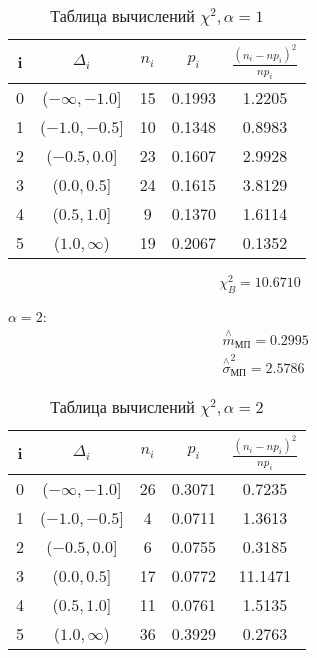 \documentclass[a4]{article}
\begin{document}
\begin{table}[H]
	\caption{Таблица вычислений $\chi^2, \alpha= 1$}
	\label{tab:my_label1}
	\begin{center}
		\vspace{5mm}
		\begin{tabular}{|c|c|c|c|c|}
			\hline
			i & $\Delta_i$ & $n_i$ & $p_i$ & $\frac{(n_i-np_i)^2}{np_i}$\\ \hline
0&  ($-\infty ,-1.0$]&  15&  0.1993&  1.2205\\ \hline
1&  ($-1.0,-0.5$]&  10&  0.1348&  0.8983\\ \hline
2&  ($-0.5,0.0$]&  23&  0.1607&  2.9928\\ \hline
3&  ($0.0,0.5$]&  24&  0.1615&  3.8129\\ \hline
4&  ($0.5,1.0$]&  9&  0.1370&  1.6114\\ \hline
5&  ($ 1.0,\infty$)&  19&  0.2067&  0.1352\\ \hline
		\end{tabular}
	\end{center}
\end{table}

$$\chi_B^2 =10.6710$$ 

$\alpha= 2$:
  \begin{equation}
  \begin{split}
  &\overset{\wedge}{m}_{\text{МП}} = 0.2995\\
  &  \overset{\wedge}{\sigma}^2_{\text{МП}} = 2.5786
  \end{split}
  \end{equation}

\begin{table}[H]
	\caption{Таблица вычислений $\chi^2, \alpha= 2$}
	\label{tab:my_label1}
	\begin{center}
		\vspace{5mm}
		\begin{tabular}{|c|c|c|c|c|}
			\hline
			i & $\Delta_i$ & $n_i$ & $p_i$ & $\frac{(n_i-np_i)^2}{np_i}$\\ \hline
0&  ($-\infty ,-1.0$]&  26&  0.3071&  0.7235\\ \hline
1&  ($-1.0,-0.5$]&  4&  0.0711&  1.3613\\ \hline
2&  ($-0.5,0.0$]&  6&  0.0755&  0.3185\\ \hline
3&  ($0.0,0.5$]&  17&  0.0772&  11.1471\\ \hline
4&  ($0.5,1.0$]&  11&  0.0761&  1.5135\\ \hline
5&  ($ 1.0,\infty$)&  36&  0.3929&  0.2763\\ \hline
		\end{tabular}
	\end{center}
\end{table}
\end{document}

